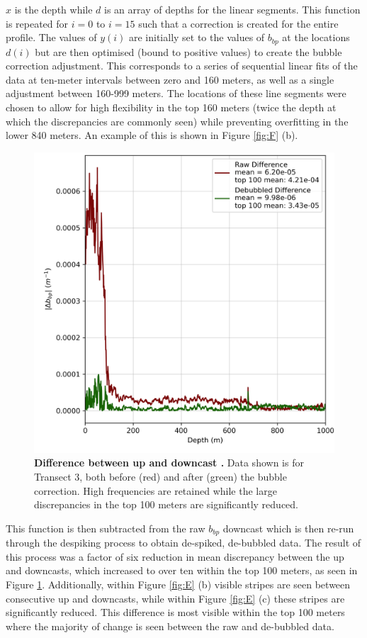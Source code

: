 \documentclass[
	a4paper, %
	10pt, %
	unnumberedsections, %
	twoside, %
]{LTJournalArticle}
\begin{document}
\begin{multicols}{2}
$x$ is the depth while $d$ is an array of depths for the linear segments.
This function is repeated for $i=0$ to $i=15$ such that a correction is created for the entire profile.
The values of $y(i)$ are initially set to the values of $b_{bp}$ at the locations $d(i)$ but are then optimised
(bound to positive values) to create the bubble correction adjustment. This corresponds to a series of sequential
linear fits of the data at ten-meter intervals between zero and 160 meters, as well as a single adjustment between
160-999 meters. The locations of these line segments were chosen to allow for high flexibility in the top 160 meters
(twice the depth at which the discrepancies are commonly seen) while preventing overfitting in the lower 840 meters.
An example of this is shown in Figure \ref{fig:F} (b).

\begin{figure}[H] 
	\includegraphics[width=\linewidth]{Louis/figures/figureG.png}
	\caption{\textbf{Difference between up and downcast .}  Data shown is for Transect 3, both before (red) and after (green) the bubble correction. High frequencies are retained while the large discrepancies in the top 100 meters are significantly reduced.}
	\label{fig:G}
\end{figure}


This function is then subtracted from the raw $b_{bp}$ downcast which is then re-run through the despiking process
to obtain de-spiked, de-bubbled data. The result of this process was a factor of six reduction in mean discrepancy
between the up and downcasts, which increased to over ten within the top 100 meters, as seen in Figure \ref{fig:G}.
Additionally, within Figure \ref{fig:E} (b) visible stripes are seen between consecutive up and downcasts, while
within Figure \ref{fig:E} (c) these stripes are significantly reduced. This difference is most visible within the
top 100 meters where the majority of change is seen between the raw and de-bubbled data.


\end{multicols}
\end{document}
